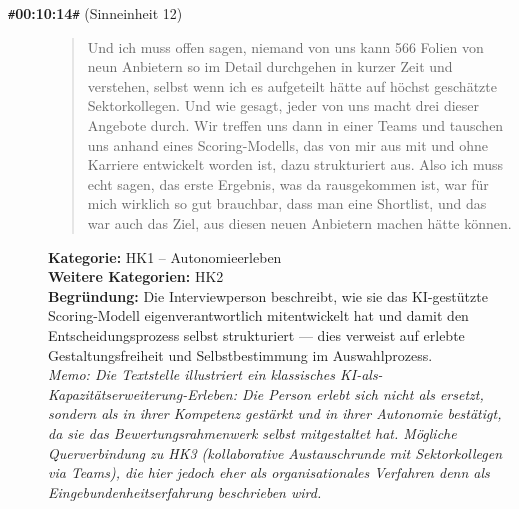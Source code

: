 \begin{description}
  \item[\texttt{\#}\textbf{00:10:14}\texttt{\#} (Sinneinheit 12)]
  \begin{quote}
  Und ich muss offen sagen, niemand von uns kann 566 Folien von neun Anbietern so im Detail durchgehen in kurzer Zeit und verstehen, selbst wenn ich es aufgeteilt hätte auf höchst geschätzte Sektorkollegen. Und wie gesagt, jeder von uns macht drei dieser Angebote durch. Wir treffen uns dann in einer Teams und tauschen uns anhand eines Scoring-Modells, das von mir aus mit und ohne Karriere entwickelt worden ist, dazu strukturiert aus. Also ich muss echt sagen, das erste Ergebnis, was da rausgekommen ist, war für mich wirklich so gut brauchbar, dass man eine Shortlist, und das war auch das Ziel, aus diesen neuen Anbietern machen hätte können.
  \end{quote}
  \textbf{Kategorie:} HK1 -- Autonomieerleben\\
  \textbf{Weitere Kategorien:} HK2\\
  \textbf{Begr\"undung:} Die Interviewperson beschreibt, wie sie das KI-gestützte Scoring-Modell eigenverantwortlich mitentwickelt hat und damit den Entscheidungsprozess selbst strukturiert — dies verweist auf erlebte Gestaltungsfreiheit und Selbstbestimmung im Auswahlprozess.
  \\\textit{Memo: Die Textstelle illustriert ein klassisches KI-als-Kapazitätserweiterung-Erleben: Die Person erlebt sich nicht als ersetzt, sondern als in ihrer Kompetenz gestärkt und in ihrer Autonomie bestätigt, da sie das Bewertungsrahmenwerk selbst mitgestaltet hat. Mögliche Querverbindung zu HK3 (kollaborative Austauschrunde mit Sektorkollegen via Teams), die hier jedoch eher als organisationales Verfahren denn als Eingebundenheitserfahrung beschrieben wird.}
\end{description}
\medskip

